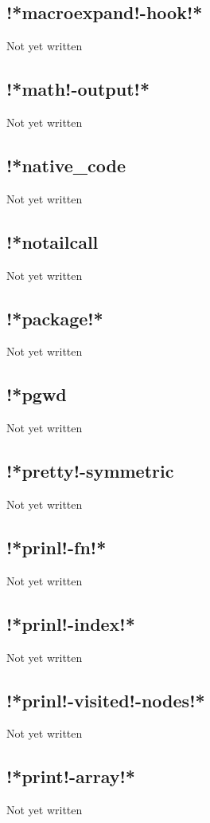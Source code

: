 \documentclass[a4paper,11pt]{article}
\begin{document}
\subsection{\ttfamily !*macroexpand!-hook!*}
   Not yet written

\subsection{\ttfamily !*math!-output!*}
   Not yet written

\subsection{\ttfamily !*native\_code}
   Not yet written

\subsection{\ttfamily !*notailcall}
   Not yet written

\subsection{\ttfamily !*package!*}
   Not yet written

\subsection{\ttfamily !*pgwd}
   Not yet written

\subsection{\ttfamily !*pretty!-symmetric}
   Not yet written

\subsection{\ttfamily !*prinl!-fn!*}
   Not yet written

\subsection{\ttfamily !*prinl!-index!*}
   Not yet written

\subsection{\ttfamily !*prinl!-visited!-nodes!*}
   Not yet written

\subsection{\ttfamily !*print!-array!*}
   Not yet written
\end{document}
